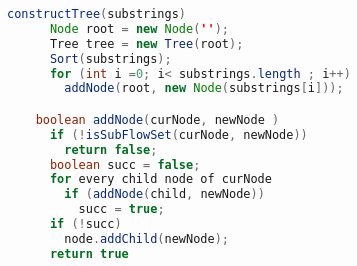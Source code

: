 \begin{lstlisting}[language=Java, caption=Алгоритм построения дерева подстрок]
    constructTree(substrings)
      Node root = new Node('');
      Tree tree = new Tree(root);
      Sort(substrings);
      for (int i =0; i< substrings.length ; i++)
        addNode(root, new Node(substrings[i]));

    boolean addNode(curNode, newNode )
      if (!isSubFlowSet(curNode, newNode))
        return false;
      boolean succ = false;
      for every child node of curNode
        if (addNode(child, newNode))
          succ = true;
      if (!succ)
        node.addChild(newNode);
      return true
    \end{lstlisting}
